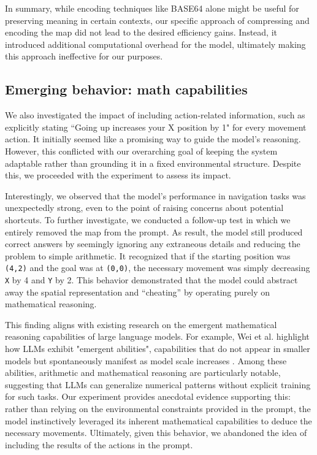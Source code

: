 In summary, while encoding techniques like BASE64 alone might be useful for
preserving meaning in certain contexts, our specific approach of compressing and
encoding the map did not lead to the desired efficiency gains. Instead, it introduced
additional computational overhead for the model, ultimately making this approach
ineffective for our purposes.

\subsection{Emerging behavior: math capabilities}

We also investigated the impact of including action-related information, such as
explicitly stating ``Going up increases your X position by 1" for every movement
action. It initially seemed like a promising way to guide the model's reasoning.
However, this conflicted with our overarching goal of keeping the system
adaptable rather than grounding it in a fixed environmental structure. Despite this,
we proceeded with the experiment to assess its impact.

Interestingly, we observed that the model's performance in navigation tasks was unexpectedly
strong, even to the point of raising concerns about potential shortcuts. To further
investigate, we conducted a follow-up test in which we entirely removed the map
from the prompt. As result, the model still produced correct answers by
seemingly ignoring any extraneous details and reducing the problem to simple
arithmetic. It recognized that if the starting position was \texttt{(4,2)} and
the goal was at \texttt{(0,0)}, the necessary movement was simply decreasing
\texttt{X} by 4 and \texttt{Y} by 2. This behavior demonstrated that the model
could abstract away the spatial representation and ``cheating'' by operating
purely on mathematical reasoning.

This finding aligns with existing research on the emergent mathematical
reasoning capabilities of large language models. For example, Wei et al. highlight
how LLMs exhibit "emergent abilities", capabilities that do not appear in
smaller models but spontaneously manifest as model scale increases
\cite{wei2022emergentabilitieslargelanguage}. Among these abilities, arithmetic
and mathematical reasoning are particularly notable, suggesting that LLMs can generalize
numerical patterns without explicit training for such tasks. Our experiment
provides anecdotal evidence supporting this: rather than relying on the environmental
constraints provided in the prompt, the model instinctively leveraged its
inherent mathematical capabilities to deduce the necessary movements. Ultimately,
given this behavior, we abandoned the idea of including the results of the actions
in the prompt.

